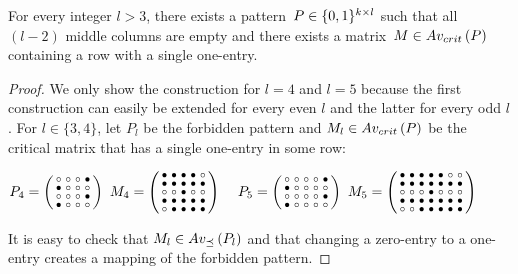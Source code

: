 \begin{prop}
For every integer $l>3$, there exists a pattern~$P\in\{0,1\}^{k\times l}$ such that all $(l-2)$ middle columns are empty and there exists a matrix~$M\in Av_{crit}\left(P\right)$ containing a row with a single one-entry.
\end{prop}
\begin{proof}
We only show the construction for $l=4$ and $l=5$ because the first construction can easily be extended for every even $l$ and the latter for every odd $l$. For $l\in\{3,4\}$, let $P_l$ be the forbidden pattern and $M_l\in Av_{crit}\left(P\right)$ be the critical matrix that has a single one-entry in some row:

$P_4=\smm{\circ&\circ&\circ&\bullet\\\bullet&\circ&\circ&\circ\\\circ&\circ&\circ&\bullet\\\bullet&\circ&\circ&\circ}
\ M_4=\smm{\bullet&\bullet&\bullet&\bullet&\circ\\\bullet&\bullet&\bullet&\bullet&\bullet\\\circ&\circ&\bullet&\circ&\circ\\\bullet&\bullet&\bullet&\bullet&\bullet\\\circ&\bullet&\bullet&\bullet&\bullet}\hspace{3mm}
\ P_5=\smm{\circ&\circ&\circ&\circ&\bullet\\\bullet&\circ&\circ&\circ&\circ\\\circ&\circ&\circ&\circ&\bullet\\\bullet&\circ&\circ&\circ&\circ}
\ M_5=\smm{\bullet&\bullet&\bullet&\bullet&\bullet&\circ&\circ\\\bullet&\bullet&\bullet&\bullet&\bullet&\bullet&\bullet\\\circ&\circ&\circ&\bullet&\circ&\circ&\circ\\\bullet&\bullet&\bullet&\bullet&\bullet&\bullet&\bullet\\\circ&\circ&\bullet&\bullet&\bullet&\bullet&\bullet}$

It is easy to check that $M_l\in Av_{\preceq}\left(P_l\right)$ and that changing a zero-entry to a one-entry creates a mapping of the forbidden pattern.
\end{proof}

